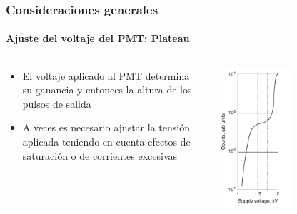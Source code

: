 \documentclass{beamer}
\begin{document}
\begin{frame}
\frametitle{Consideraciones generales}
\framesubtitle{Ajuste del voltaje del PMT: Plateau}
\begin{columns}
\begin{column}{0.5\textwidth}
\begin{itemize}
\item El voltaje aplicado al PMT determina su ganancia y entonces la altura de
los pulsos de salida
\item A veces es necesario ajustar la tensión aplicada teniendo en cuenta
efectos de saturación o de corrientes excesivas
\end{itemize}
\end{column}
\begin{column}{0.5\textwidth}
\begin{center}
\includegraphics[width=0.5\textwidth]{d1/plateau}
\end{center}
\end{column}
\end{columns}
\end{frame}
\end{document}
